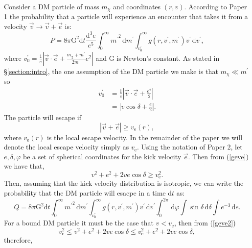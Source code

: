 \documentclass[aps,floatfix,prd,showpacs]{revtex4}
\newcommand{\diff}{\mathrm{d}}
\newcommand{\vesc}{v_{\text{e}}}
\newcommand{\vp}{v^\prime}
\newcommand{\mpr}{m^\prime}
\newcommand{\G}{\text{G}}
\newcommand{\mx}{m_\chi}
\begin{document}
Consider a DM particle of mass $\mx$ and coordinates $(r,v)$.  According to Paper 1 the probability that a particle will experience an encounter that takes it from a velocity $\vec{v} \rightarrow \vec{v} + \vec{e}$ is:
%
\begin{equation}
P = 8\pi \G^2\diff t\frac{\diff^3e}{e^5}\int^\infty_0 {\mpr}^2\,\diff \mpr\int^\infty_{\vp_0}g(r,\vp,\mpr)\vp\,\diff \vp, 
\end{equation}
%
%
where $\vp_0 = \frac{1}{e}|\vec{v}\cdot\vec{e} + \frac{\mx+\mpr}{2\mpr}e^2|$ and G is Newton's constant.  As stated in \S\ref{section:intro}, the one assumption of the DM particle we make is that $\mx \ll \mpr$ so 
%
\begin{equation}
\label{v0p1}
\begin{split}
\vp_0 &= \frac{1}{e}|\vec{v}\cdot\vec{e} + \frac{e^2}{2}| \\
&= |v\cos\delta + \frac{e}{2}|.
\end{split}
\end{equation}
%
%
The particle will escape if 
%
\begin{equation}
|\vec{v}+\vec{e}| \ge \vesc(r),
\label{geve}
\end{equation}
%
%
where $\vesc(r)$ is the local escape velocity.  In the remainder of the paper we will denote the local escape velocity simply as $\vesc$.  Using the notation of Paper 2, let $e, \delta, \varphi$ be a set of spherical coordinates for the kick velocity $\vec{e}$.  Then from (\ref{geve}) we have that,
%
% 
\begin{equation}
\label{geve2}
v^2 + e^2 + 2ve\cos\delta \ge \vesc^2.
\end{equation}
Then, assuming that the kick velocity distribution is isotropic, we can write the probability that the DM particle will esacpe in a time d$t$ as:
%
\begin{equation}
Q = 8\pi\G^2\diff t\int^\infty_0 {\mpr}^2\,\diff \mpr\int^\infty_{\vp_0}g(r,\vp,\mpr)\vp\,\diff \vp\int^{2\pi}_0{}\,\diff \varphi\int{\sin\delta}\,\diff \delta\int{e^{-3}}\,\diff e.
\end{equation}
%
%
For a bound DM particle it must be the case that $v < \vesc$, then from (\ref{geve2})
%
\begin{equation}
\vesc^2 \le v^2 + e^2 + 2ve\cos\delta \le \vesc^2 + e^2 + 2ve\cos\delta,
\end{equation}
%
%
therefore,
%
\end{document}
